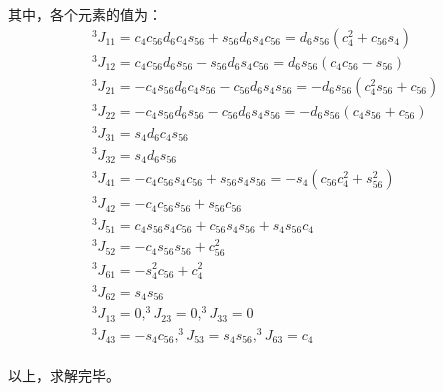 \documentclass{ctexart}
\begin{document}
其中，各个元素的值为：
\begin{equation}
	\begin{aligned}
		&^3J_{11} = c_4c_{56}d_6c_4s_{56} +s_{56}d_6s_4c_{56} = d_6s_{56}(c_4^2+c_{56}s_4)\\
		&^3J_{12} = c_4c_{56}d_6s_{56} -s_{56}d_6s_4c_{56} = d_6s_{56}(c_4c_{56}-s_{56})\\
		&^3J_{21} = -c_4s_{56}d_6c_4s_{56} -c_{56}d_6s_4s_{56} = -d_6s_{56}(c_4^2s_{56}+c_{56})\\
		&^3J_{22} = -c_4s_{56}d_6s_{56} - c_{56}d_6s_4s_{56} = -d_6s_{56}(c_4s_{56}+c_{56})\\
		&^3J_{31} = s_4d_6c_4s_{56} \\
		&^3J_{32} = s_4d_6s_{56} \\
		&^3J_{41} = -c_4c_{56}s_4c_{56} + s_{56}s_4s_{56} = -s_4(c_56c_4^2+s_{56}^2)\\
		&^3J_{42} = -c_4c_{56}s_{56}+s_{56}c_{56}\\
		&^3J_{51} = c_4s_{56}s_4c_{56} + c_{56}s_4s_{56}+s_4s_{56}c_4\\
		&^3J_{52} = -c_4s_{56}s_{56}+c_{56}^2\\
		&^3J_{61} = -s_4^2c_{56} + c_4^2\\
		&^3J_{62} = s_4s_{56}\\
		&^3J_{13} = 0,^3J_{23} = 0,^3J_{33} = 0\\
		&^3J_{43} = -s_4c_{56} ,^3J_{53} = s_4s_{56},^3J_{63} = c_4\\
	\end{aligned}
\end{equation}

以上，求解完毕。
\end{document}
